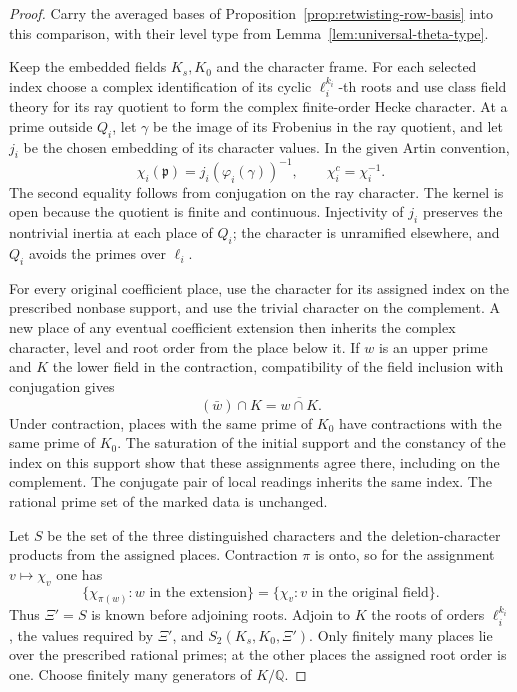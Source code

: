 \begin{proof}
Carry the averaged bases of Proposition~\ref{prop:retwisting-row-basis}
into this comparison, with their level type from
Lemma~\ref{lem:universal-theta-type}.

Keep the embedded fields \(K_s,K_0\) and the character frame.
For each selected index choose a complex identification of its
cyclic \(\ell_i^{k_i}\)-th roots and use class field theory for
its ray quotient to form the complex finite-order Hecke
character. At a prime outside \(Q_i\), let \(\gamma\) be
the image of its Frobenius in the ray quotient, and let \(j_i\)
be the chosen embedding of its character values. In the given
Artin convention,
\[
 \chi_i(\mathfrak p)=j_i(\varphi_i(\gamma))^{-1},\qquad
 \chi_i^c=\chi_i^{-1}.
\]
The second equality follows from conjugation on the ray character.
The kernel is open because the quotient is finite and continuous.
Injectivity of \(j_i\) preserves the nontrivial inertia at each
place of \(Q_i\); the character is unramified elsewhere, and
\(Q_i\) avoids the primes over \(\ell_i\).

For every original
coefficient place, use the character for its assigned index
on the prescribed nonbase support, and use the trivial
character on the complement. A new place of any eventual
coefficient extension then inherits the complex character,
level and root order from the place below it. If \(w\) is an upper prime and \(K\) the lower field in the contraction, compatibility of the field inclusion with conjugation gives
\[
 (\bar w)\cap K=\overline{w\cap K}.
\]
Under contraction,
places with the same prime of \(K_0\) have contractions with the
same prime of \(K_0\). The saturation of the initial support
and the constancy of the index on this support show that
these assignments agree there, including on the complement.
The conjugate pair of local readings inherits the same index.
The rational prime set of the marked data is unchanged.

Let \(S\) be the set of the three distinguished characters and the
deletion-character products from the assigned places. Contraction
\(\pi\) is onto, so for the assignment \(v\mapsto\chi_v\) one has
\[
 \{\chi_{\pi(w)}:w\text{ in the extension}\}
                 =\{\chi_v:v\text{ in the original field}\}.
\]
Thus \(\Xi'=S\) is known before adjoining roots. Adjoin to \(K\)
the roots of orders \(\ell_i^{k_i}\), the values required by
\(\Xi'\), and \(S_2(K_s,K_0,\Xi')\). Only finitely many places
lie over the prescribed rational primes; at the other places
the assigned root order is one. Choose finitely many generators
of \(K/\mathbb Q\).


\end{proof}
